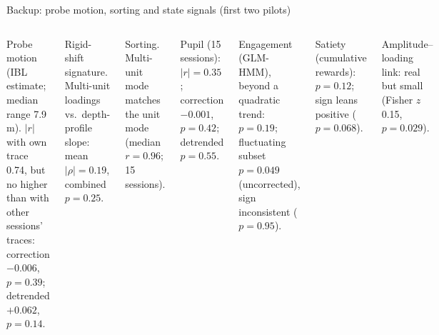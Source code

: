 \documentclass[aspectratio=169,11pt]{beamer}
\begin{document}
\begin{frame}{Backup: probe motion, sorting and state signals (first two pilots)}
\small
\begin{columns}[T,onlytextwidth]
Probe motion (IBL estimate; median range 7.9\,\textmu m). $|r|$ with own trace 0.74, but no higher than with
other sessions' traces: correction $-0.006$, $p = 0.39$; detrended $+0.062$, $p = 0.14$.

\medskip
Rigid-shift signature. Multi-unit loadings vs.\ depth-profile slope: mean $|\rho| = 0.19$, combined
$p = 0.25$.

\medskip
Sorting. Multi-unit mode matches the unit mode (median $r = 0.96$; 15 sessions).

Pupil (15 sessions): $|r| = 0.35$; correction $-0.001$, $p = 0.42$; detrended $p = 0.55$.

\medskip
Engagement (GLM-HMM), beyond a quadratic trend: $p = 0.19$; fluctuating subset $p = 0.049$
(uncorrected), sign inconsistent ($p = 0.95$).

\medskip
Satiety (cumulative rewards): $p = 0.12$; sign leans positive ($p = 0.068$).

\medskip
Amplitude--loading link: real but small (Fisher $z$ 0.15, $p = 0.029$).
\end{columns}
\end{frame}
\end{document}
